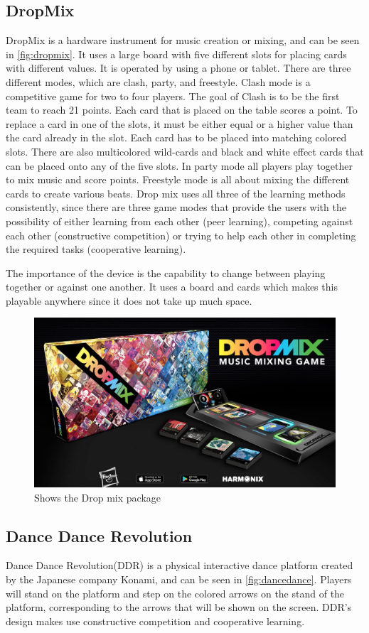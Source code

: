 \subsection{DropMix}
DropMix is a hardware instrument for music creation or mixing, and can be seen in \autoref{fig:dropmix}. It uses a large board with five different slots for placing cards with different values. It is operated by using a phone or tablet. There are three different modes, which are clash, party, and freestyle. Clash mode is a competitive game for two to four players. The goal of Clash is to be the first team to reach 21 points. Each card that is placed on the table scores a point. To replace a card in one of the slots, it must be either equal or a higher value than the card already in the slot. Each card has to be placed into matching colored slots. There are also multicolored wild-cards and black and white effect cards that can be placed onto any of the five slots. In party mode all players play together to mix music and score points. Freestyle mode is all about mixing the different cards to create various beats. Drop mix uses all three of the learning methods consistently, since there are three game modes that provide the users with the possibility of either learning from each other (peer learning), competing against each other (constructive competition) or trying to help each other in completing the required tasks (cooperative learning).

The importance of the device is the capability to change between playing together or against one another. It uses a board and cards which makes this playable anywhere since it does not take up much space.


\begin{figure}[H]
	\centering
	\includegraphics[width=0.7\linewidth]{figure/Analysis/dropmix}
	\caption{Shows the Drop mix package}
	\label{fig:dropmix}
\end{figure}


\subsection{Dance Dance Revolution}
Dance Dance Revolution(DDR) is a physical interactive dance platform created by the Japanese company Konami, and can be seen in \autoref{fig:dancedance}. Players will stand on the platform and step on the colored arrows on the stand of the platform, corresponding to the arrows that will be shown on the screen. DDR's design makes use constructive competition and cooperative learning.

